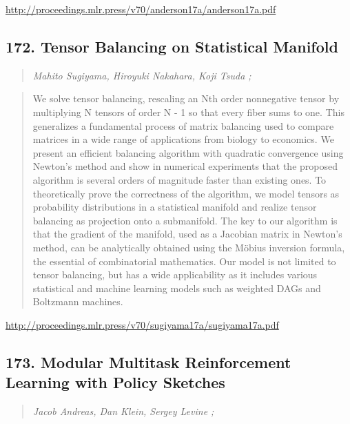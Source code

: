 \documentclass{article}
\begin{document}
\href{http://proceedings.mlr.press/v70/anderson17a/anderson17a.pdf}{http://proceedings.mlr.press/v70/anderson17a/anderson17a.pdf}

\subsection{172. Tensor Balancing on Statistical Manifold}

\begin{quote}
\footnotesize{\textit{Mahito Sugiyama, Hiroyuki Nakahara, Koji Tsuda ;}}
\end{quote}

\begin{quote}
    We solve tensor balancing, rescaling an Nth order nonnegative tensor by multiplying N tensors of order N - 1 so that every fiber sums to one. This generalizes a fundamental process of matrix balancing used to compare matrices in a wide range of applications from biology to economics. We present an efficient balancing algorithm with quadratic convergence using Newton’s method and show in numerical experiments that the proposed algorithm is several orders of magnitude faster than existing ones. To theoretically prove the correctness of the algorithm, we model tensors as probability distributions in a statistical manifold and realize tensor balancing as projection onto a submanifold. The key to our algorithm is that the gradient of the manifold, used as a Jacobian matrix in Newton’s method, can be analytically obtained using the Möbius inversion formula, the essential of combinatorial mathematics. Our model is not limited to tensor balancing, but has a wide applicability as it includes various statistical and machine learning models such as weighted DAGs and Boltzmann machines.  \end{quote}

\href{http://proceedings.mlr.press/v70/sugiyama17a/sugiyama17a.pdf}{http://proceedings.mlr.press/v70/sugiyama17a/sugiyama17a.pdf}

\subsection{173. Modular Multitask Reinforcement Learning with Policy Sketches}

\begin{quote}
\footnotesize{\textit{Jacob Andreas, Dan Klein, Sergey Levine ;}}
\end{quote}
\end{document}
